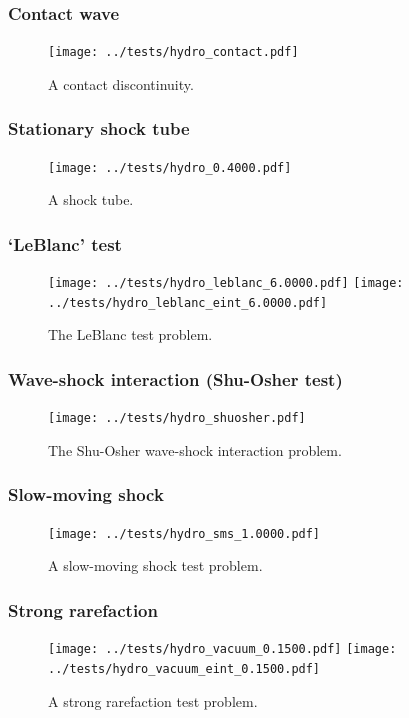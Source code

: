 \documentclass[fleqn,usenatbib]{mnras}
\begin{document}
\subsubsection{Contact wave}
\begin{figure}
    \texttt{[image: ../tests/hydro\_contact.pdf]}
    \caption{A contact discontinuity.}
    \label{fig:contact_wave}
\end{figure}
\subsubsection{Stationary shock tube}
\begin{figure}
    \texttt{[image: ../tests/hydro\_0.4000.pdf]}
    \caption{A shock tube.}
    \label{fig:shocktube}
\end{figure}
\subsubsection{`LeBlanc' test}
\begin{figure}
    \texttt{[image: ../tests/hydro\_leblanc\_6.0000.pdf]}
    \texttt{[image: ../tests/hydro\_leblanc\_eint\_6.0000.pdf]}
    \caption{The LeBlanc test problem.}
    \label{fig:leblanc}
\end{figure}
\subsubsection{Wave-shock interaction (Shu-Osher test)}
\begin{figure}
    \texttt{[image: ../tests/hydro\_shuosher.pdf]}
    \caption{The Shu-Osher wave-shock interaction problem.}
    \label{fig:shu_osher}
\end{figure}
\subsubsection{Slow-moving shock}
\begin{figure}
    \texttt{[image: ../tests/hydro\_sms\_1.0000.pdf]}
    \caption{A slow-moving shock test problem.}
    \label{fig:sms}
\end{figure}
\subsubsection{Strong rarefaction}
\begin{figure}
    \texttt{[image: ../tests/hydro\_vacuum\_0.1500.pdf]}
    \texttt{[image: ../tests/hydro\_vacuum\_eint\_0.1500.pdf]}
    \caption{A strong rarefaction test problem.}
    \label{fig:vacuum}
\end{figure}
\end{document}

